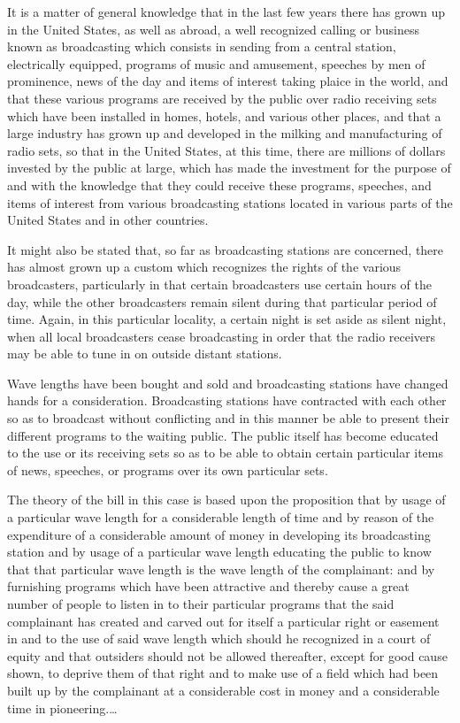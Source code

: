 It is a matter of general knowledge that in the last few years there has grown
up in the United States, as well as abroad, a well recognized calling or
business known as broadcasting which consists in sending from a central
station, electrically equipped, programs of music and amusement, speeches by
men of prominence, news of the day and items of interest taking plaice in the
world, and that these various programs are received by the public over radio
receiving sets which have been installed in homes, hotels, and various other
places, and that a large industry has grown up and developed in the milking and
manufacturing of radio sets, so that in the United States, at this time, there
are millions of dollars invested by the public at large, which has made the
investment for the purpose of and with the knowledge that they could receive
these programs, speeches, and items of interest from various broadcasting
stations located in various parts of the United States and in other countries.

It might also be stated that, so far as broadcasting stations are concerned,
there has almost grown up a custom which recognizes the rights of the various
broadcasters, particularly in that certain broadcasters use certain
hours of the day, while the other broadcasters remain silent during that
particular period of time. Again, in this particular locality, a certain night
is set aside as silent night, when all local broadcasters cease broadcasting in
order that the radio receivers may be able to tune in on outside distant
stations.

Wave lengths have been bought and sold and broadcasting stations have changed
hands for a consideration. Broadcasting stations have contracted with each
other so as to broadcast without conflicting and in this manner be able to
present their different programs to the waiting public. The public itself has
become educated to the use or its receiving sets so as to be able to obtain
certain particular items of news, speeches, or programs over its own particular
sets.

The theory of the bill in this case is based upon the proposition that by usage
of a particular wave length for a considerable length of time and by reason of
the expenditure of a considerable amount of money in developing its
broadcasting station and by usage of a particular wave length educating the
public to know that that particular wave length is the wave length of the
complainant: and by furnishing programs which have been attractive and thereby
cause a great number of people to listen in to their particular programs that
the said complainant has created and carved out for itself a particular right
or easement in and to the use of said wave length which should he recognized
in a court of equity and that outsiders should not be allowed thereafter,
except for good cause shown, to deprive them of that right and to make use of a
field which had been built up by the complainant at a considerable cost in
money and a considerable time in pioneering.\ldots

